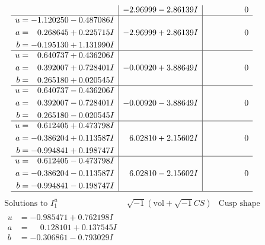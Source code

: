 \documentclass[1p]{elsarticle_modified}
\theoremstyle{definition}
\newcommand{\I}{\sqrt{-1}}
\begin{document}
$$\begin{array}{c|c|c}
 & -2.96999 - 2.86139 I & \phantom{-0.000000 } 0 \\ \hline\begin{aligned}
u &= -1.120250 - 0.487086 I \\
a &= \phantom{-}0.268645 + 0.225715 I \\
b &= -0.195130 + 1.131990 I\end{aligned}
 & -2.96999 + 2.86139 I & \phantom{-0.000000 } 0 \\ \hline\begin{aligned}
u &= \phantom{-}0.640737 + 0.436206 I \\
a &= \phantom{-}0.392007 + 0.728401 I \\
b &= \phantom{-}0.265180 + 0.020545 I\end{aligned}
 & -0.00920 + 3.88649 I & \phantom{-0.000000 } 0 \\ \hline\begin{aligned}
u &= \phantom{-}0.640737 - 0.436206 I \\
a &= \phantom{-}0.392007 - 0.728401 I \\
b &= \phantom{-}0.265180 - 0.020545 I\end{aligned}
 & -0.00920 - 3.88649 I & \phantom{-0.000000 } 0 \\ \hline\begin{aligned}
u &= \phantom{-}0.612405 + 0.473798 I \\
a &= -0.386204 + 0.113587 I \\
b &= -0.994841 + 0.198747 I\end{aligned}
 & \phantom{-}6.02810 + 2.15602 I & \phantom{-0.000000 } 0 \\ \hline\begin{aligned}
u &= \phantom{-}0.612405 - 0.473798 I \\
a &= -0.386204 - 0.113587 I \\
b &= -0.994841 - 0.198747 I\end{aligned}
 & \phantom{-}6.02810 - 2.15602 I & \phantom{-0.000000 } 0\\
 \hline 
 \end{array}$$\newpage$$\begin{array}{c|c|c}  
\text{Solutions to }I^u_{1}& \I (\text{vol} + \sqrt{-1}CS) & \text{Cusp shape}\\
 \hline 
\begin{aligned}
u &= -0.985471 + 0.762198 I \\
a &= \phantom{-}0.128101 + 0.137545 I \\
b &= -0.306861 - 0.793029 I\end{aligned}

\end{array}$$
\end{document}
